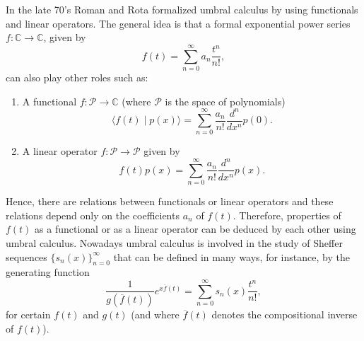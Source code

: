 \documentclass[11pt]{article}
\theoremstyle{plain}
\theoremstyle{remark}
\numberwithin{equation}{section} %
\begin{document}
In the late 70's Roman and Rota \cite{RomRot} formalized umbral calculus by using functionals and linear operators. The general idea is that a formal exponential power series $f: \mathbb{C} \to \mathbb{C}$, given by
\[
f(t) = \sum_{n=0}^{\infty} a_n\frac{t^n}{n!},
\]
can also play other roles such as:
\begin{enumerate}
\item A functional $f: \mathcal{P} \to \mathbb{C}$ (where $\mathcal{P}$ is the space of polynomials)
\begin{equation}
\label{def:fun}
\langle f(t) \mid p(x)\rangle = \sum_{n=0}^\infty \frac{a_n}{n!} \frac{d^n}{dx^n}p(0).
\end{equation}
\item A linear operator $f: \mathcal{P} \to \mathcal{P}$ given by
\begin{equation}
\label{def:ope}
f(t)p(x) = \sum_{n=0}^\infty \frac{a_n}{n!}\frac{d^n}{dx^n}p(x).
\end{equation}
\end{enumerate}

Hence, there are relations between functionals or linear operators and these relations depend only on the coefficients $a_n$ of $f(t)$. Therefore, properties of $f(t)$ as a functional or as a linear operator can be deduced by each other using umbral calculus. Nowadays umbral calculus is involved in the study of Sheffer sequences $\{s_n(x)\}_{n=0}^\infty$ that can be defined in many ways, for instance, by the generating function
\[
\frac{1}{g(\overline{f}(t))}e^{x\overline{f}(t)} = \sum_{n=0}^\infty {s_n(x)} \frac{t^n}{n!},
\]
for certain $f(t)$ and $g(t)$ (and where $\overline{f}(t)$ denotes the compositional inverse of $f(t)$).
\end{document}
